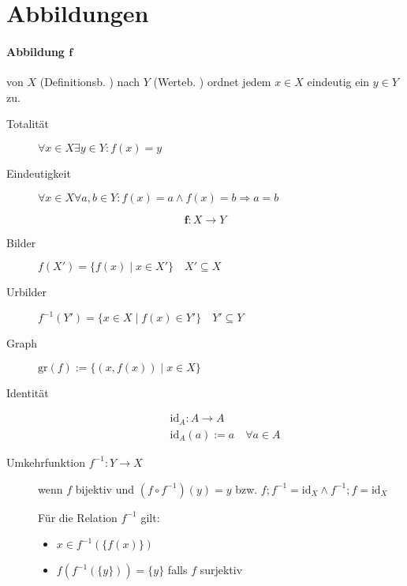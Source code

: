 \section{Abbildungen}

\paragraph{Abbildung $\mathbf{f}$}
von $X$ (Definitionsb. ) nach $Y$ (Werteb. ) ordnet jedem $x \in X$ eindeutig ein $y \in Y$ zu.

\begin{description}
  \item[Totalität] $\forall x \in X \exists y \in Y: f(x) = y$
  \item[Eindeutigkeit] $\forall x \in X \forall a, b \in Y: f(x) = a \land f(x) = b \Rightarrow a = b$
\end{description}

$$\mathbf{f}: X \rightarrow Y$$

\begin{description}
  \item [Bilder] $f(X') = \{ f(x) \mid x \in X' \} \quad X' \subseteq X$
  \item [Urbilder] $f^{-1}(Y') = \{ x \in X \mid f(x) \in Y' \} \quad Y' \subseteq Y$
\end{description}

\begin{description}
  \item [Graph]
        $\text{gr} (f) := \{ (x, f(x)) \mid x \in X \}$

  \item [Identität]
        \begin{align*}
           & \text{id}_A: A \rightarrow A              \\
           & \text{id}_A(a) := a \quad \forall a \in A
        \end{align*}

  \item [Umkehrfunktion $f^{-1}: Y \rightarrow X$]
        wenn $f$ bijektiv und $(f \circ f^{-1}) (y) = y$ bzw. $f;f^{-1} = \text{id}_X \land f^{-1};f = \text{id}_X$

        Für die Relation $f^{-1}$ gilt:

        \begin{itemize}
          \item $x \in f^{-1}(\{ f(x) \})$
          \item $f(f^{-1}(\{ y \})) = \{ y \}$ falls $f$ surjektiv
        \end{itemize}
\end{description}

